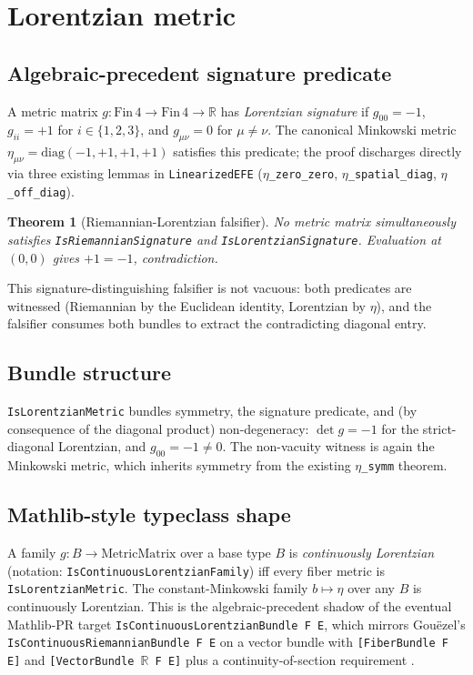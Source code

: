 \documentclass[twocolumn]{revtex4-2}
\newtheorem{theorem}{Theorem}
\newcommand{\MetricMatrix}{g}
\newcommand{\Mink}{\eta}
\begin{document}
\section{Lorentzian metric}\label{sec:lorentzian}

\subsection{Algebraic-precedent signature predicate}

A metric matrix $\MetricMatrix : \mathrm{Fin}\,4 \to \mathrm{Fin}\,4 \to \mathbb{R}$
has \emph{Lorentzian signature} if
$\MetricMatrix_{00} = -1$, $\MetricMatrix_{ii} = +1$ for $i \in
\{1,2,3\}$, and $\MetricMatrix_{\mu\nu} = 0$ for $\mu \neq \nu$. The
canonical Minkowski metric $\Mink_{\mu\nu} = \mathrm{diag}(-1,+1,+1,+1)$
satisfies this predicate; the proof discharges directly via three
existing lemmas in \texttt{LinearizedEFE} (\texttt{$\eta$\_zero\_zero},
\texttt{$\eta$\_spatial\_diag}, \texttt{$\eta$\_off\_diag}).

\begin{theorem}[Riemannian-Lorentzian falsifier]\label{thm:falsifier}
No metric matrix simultaneously satisfies \texttt{IsRiemannianSignature}
and \texttt{IsLorentzianSignature}. Evaluation at $(0,0)$ gives
$+1 = -1$, contradiction.
\end{theorem}

This signature-distinguishing falsifier is not vacuous: both
predicates are
witnessed (Riemannian by the Euclidean identity, Lorentzian by
$\Mink$), and the falsifier consumes both bundles to extract the
contradicting diagonal entry.

\subsection{Bundle structure}

\texttt{IsLorentzianMetric} bundles symmetry, the signature predicate,
and (by consequence of the diagonal product) non-degeneracy:
$\det \MetricMatrix = -1$ for the strict-diagonal Lorentzian, and
$\MetricMatrix_{00} = -1 \neq 0$. The non-vacuity witness is again
the Minkowski metric, which inherits symmetry from the
existing \texttt{$\eta$\_symm} theorem.

\subsection{Mathlib-style typeclass shape}

A family $\MetricMatrix : B \to \mathrm{MetricMatrix}$ over a base
type $B$ is \emph{continuously Lorentzian} (notation:
\texttt{IsContinuousLorentzianFamily}) iff every fiber metric is
\texttt{IsLorentzianMetric}. The constant-Minkowski family
$b \mapsto \Mink$ over any $B$ is continuously Lorentzian. This is
the algebraic-precedent shadow of the eventual Mathlib-PR target
\texttt{IsContinuousLorentzianBundle F E}, which mirrors Gou\"ezel's
\texttt{IsContinuousRiemannianBundle F E} on a vector bundle with
\texttt{[FiberBundle F E]} and \texttt{[VectorBundle $\mathbb{R}$ F E]}
plus a continuity-of-section requirement \cite{Gouezel2025}.
\end{document}
